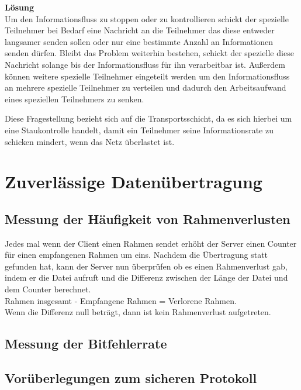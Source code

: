 \documentclass{scrartcl}
\begin{document}
     \textbf{Lösung}\\
     Um den Informationsfluss zu stoppen oder zu kontrollieren schickt der spezielle Teilnehmer bei Bedarf eine Nachricht an die Teilnehmer das diese entweder langsamer senden sollen oder nur eine bestimmte Anzahl an Informationen senden dürfen. Bleibt das Problem weiterhin bestehen, schickt der spezielle diese Nachricht solange bis der Informationsfluss für ihn verarbeitbar ist.
     Außerdem können weitere spezielle Teilnehmer eingeteilt werden um den Informationsfluss an mehrere spezielle Teilnehmer zu verteilen und dadurch den Arbeitsaufwand eines speziellen Teilnehmers zu senken.
     
     Diese Fragestellung bezieht sich auf die Transportsschicht, da es sich hierbei um eine Staukontrolle handelt, damit ein Teilnehmer seine Informationsrate zu schicken mindert, wenn das Netz überlastet ist.

  \newpage
\section[Versuch 2 Zuverlässige Datenübertragung]{Zuverlässige Datenübertragung}
  \subsection[Aufgabe 2 Messung der Häufigkeit von Rahmenverlusten]{Messung der Häufigkeit von Rahmenverlusten}
  
  Jedes mal wenn der Client einen Rahmen sendet erhöht der Server einen Counter für einen empfangenen Rahmen um eins. Nachdem die Übertragung statt gefunden hat, kann der Server nun überprüfen ob es einen Rahmenverlust gab, indem er die Datei aufruft und die Differenz zwischen der Länge der Datei und dem Counter berechnet. \\
Rahmen insgesamt - Empfangene  Rahmen = Verlorene Rahmen.\\
Wenn die Differenz null beträgt, dann ist kein Rahmenverlust aufgetreten.

  \subsection[Aufgabe 3 Messung der Bitfehlerrate]{Messung der Bitfehlerrate}
 
  \subsection[Aufgabe 4 Vorüberlegungen zum sicheren Protokoll]{Vorüberlegungen zum sicheren Protokoll}
  
\end{document}
